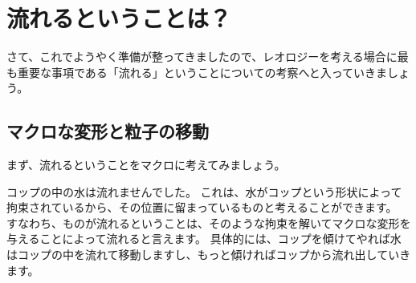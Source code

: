 \documentclass[uplatex,dvipdfmx,a4paper,11pt]{jsarticle}
\begin{document}
\section{流れるということは？}

さて、これでようやく準備が整ってきましたので、レオロジーを考える場合に最も重要な事項である「流れる」ということについての考察へと入っていきましょう。

\subsection{マクロな変形と粒子の移動}

まず、流れるということをマクロに考えてみましょう。

コップの中の水は流れませんでした。
これは、水がコップという形状によって拘束されているから、その位置に留まっているものと考えることができます。
すなわち、ものが流れるということは、そのような拘束を解いてマクロな変形を与えることによって流れると言えます。
具体的には、コップを傾けてやれば水はコップの中を流れて移動しますし、もっと傾ければコップから流れ出していきます。
\end{document}

